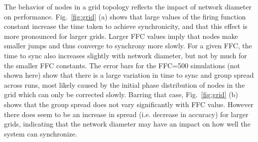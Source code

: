 The behavior of nodes in a grid topology reflects the impact of
network diameter on performance. Fig.~\ref{fig:grid} (a) shows that
large values of the firing function constant increase the time taken
to achieve synchronicity, and that this effect is more pronounced for
larger grids. Larger FFC values imply that nodes make smaller jumps
and thus converge to synchrony more slowly. For a given FFC, the time
to sync also increases slightly with network diameter, but not by much
for the smaller FFC constants. The error bars for the FFC=500
simulations (not shown here) show that there is a large variation in
time to sync and group spread across runs, most likely caused by the
initial phase distribution of nodes in the grid which can only be
corrected slowly. Barring that case, Fig.~\ref{fig:grid} (b) shows
that the group spread does not vary significantly with FFC
value. However there does seem to be an increase in spread
(i.e. decrease in accuracy) for larger grids, indicating that the
network diameter may have an impact on how well the system can
synchronize.





